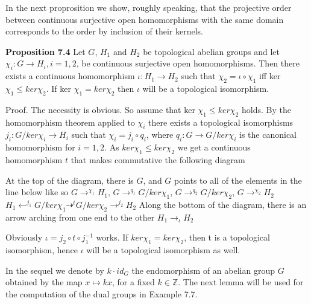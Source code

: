 \documentclass[12pt]{article}
\begin{document}
\begin{itemize}
\begin{itemize}
In the next proprosition we show, roughly speaking, that the projective order between continuous surjective
open homomorphisms with the same domain corresponds to the order by inclusion of their kernels.


\textbf{Proposition 7.4} Let $G$, $H_1$ and $H_2$ be topological abelian groups and let $\chi_i: G \to H_i, i = 1, 2$, be continuous
surjective open homomorphisms. Then there exists a continuous homomorphism $\iota : H_1 \to H_2$ such that $\chi_2 = \iota \circ \chi_1 $
iff ker $\chi_1 \leq ker \chi_2$. If ker $\chi_1 = ker \chi_2$ then $\iota$ will be a topological isomorphism.


    Proof. The necessity is obvious. So assume that ker $\chi_1 \leq ker \chi_2$ holds. By the homomorphism theorem applied
to $\chi_i$ there exists a topological isomorphisms $j_i: G/ ker \chi_i \to H_i$ such that $\chi_i = j_i \circ q_i$, where $q_i: G \to G/ ker \chi_i$
is the canonical homomorphism for $i = 1, 2$. As $ker \chi_1 \leq ker \chi_2$ we get a continuous homomorphism $t$ that
makes commutative the following diagram

At the top of the diagram, there is $G$, and $G$ points to all of the elements in the line below like so $G \to^{\chi_1} H_1$, $G \to^{q_1} G / ker \chi_1$, $G \to^{q_2} G / ker \chi_2$, $G \to^{\chi_2} H_2$
$H_1 \leftarrow^{j_1} G / ker \chi_1 \dashrightarrow^t G / ker \chi_2 \rightarrow^{j_2} H_2$
Along the bottom of the diagram, there is an arrow arching from one end to the other $H_1 \to_\iota H_2$


Obviously $\iota = j_2 \circ t \circ j^{-1}_1$ works. If $ker \chi_1 = ker \chi_2$, then t is a topological isomorphism, hence $\iota$ will be a
topological isomorphism as well.


    In the sequel we denote by $k · id_G$ the endomorphism of an abelian group $G$ obtained by the map $x \mapsto kx$,
for a fixed $k \in \mathbb{Z}$. The next lemma will be used for the computation of the dual groups in Example 7.7.



\end{itemize}
\end{itemize}
\end{document}
